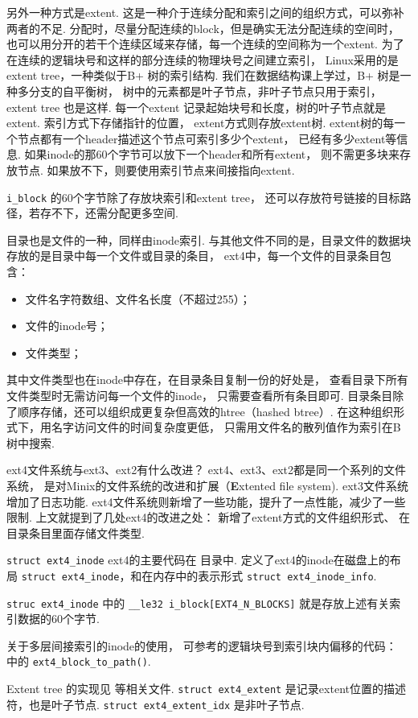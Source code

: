 另外一种方式是extent.
这是一种介于连续分配和索引之间的组织方式，可以弥补两者的不足.
分配时，尽量分配连续的block，但是确实无法分配连续的空间时，
也可以用分开的若干个连续区域来存储，每一个连续的空间称为一个extent. 
为了在连续的逻辑块号和这样的部分连续的物理块号之间建立索引，
Linux采用的是extent tree，一种类似于B+ 树的索引结构.
我们在数据结构课上学过，B+ 树是一种多分支的自平衡树，
树中的元素都是叶子节点，非叶子节点只用于索引，
extent tree 也是这样.
每一个extent 记录起始块号和长度，树的叶子节点就是extent.
索引方式下存储指针的位置，
extent方式则存放extent树.
extent树的每一个节点都有一个header描述这个节点可索引多少个extent，
已经有多少extent等信息.
如果inode的那60个字节可以放下一个header和所有extent，
则不需更多块来存放节点.
如果放不下，则要使用索引节点来间接指向extent.\cite{Ext4Extent}

\lstinline{i_block} 的60个字节除了存放块索引和extent tree，
还可以存放符号链接的目标路径，若存不下，还需分配更多空间.

目录也是文件的一种，同样由inode索引.
与其他文件不同的是，目录文件的数据块存放的是目录中每一个文件或目录的条目，
ext4中，每一个文件的目录条目包含：
\begin{itemize}
	\item 文件名字符数组、文件名长度（不超过255）；
	\item 文件的inode号；
	\item 文件类型；
\end{itemize}
其中文件类型也在inode中存在，在目录条目复制一份的好处是，
查看目录下所有文件类型时无需访问每一个文件的inode，
只需要查看所有条目即可.\cite{ext4dynamic}
目录条目除了顺序存储，还可以组织成更复杂但高效的htree（hashed btree）. 
在这种组织形式下，用名字访问文件的时间复杂度更低，
只需用文件名的散列值作为索引在B树中搜索.

\begin{qbox}{ext4文件系统与ext3、ext2有什么改进？}
	ext4、ext3、ext2都是同一个系列的文件系统，
	是对Minix的文件系统的改进和扩展（\textbf{E}xtented file system).
	ext3文件系统增加了日志功能.
	ext4文件系统则新增了一些功能，提升了一点性能，减少了一些限制.
	上文就提到了几处ext4的改进之处：
	新增了extent方式的文件组织形式、
	在目录条目里面存储文件类型.
\end{qbox}

\begin{readsrcbox}{\lstinline{struct ext4_inode}}
	ext4的主要代码在  目录中.
	 定义了ext4的inode在磁盘上的布局 \lstinline{struct ext4_inode}，和在内存中的表示形式 \lstinline{struct ext4_inode_info}.

	\lstinline{struc ext4_inode} 中的
	\lstinline{__le32 i_block[EXT4_N_BLOCKS]}
	就是存放上述有关索引数据的60个字节.

	关于多层间接索引的inode的使用，
	可参考的逻辑块号到索引块内偏移的代码：
	 中的 \lstinline{ext4_block_to_path()}.

	Extent tree 的实现见  等相关文件.
	\lstinline{struct ext4_extent} 是记录extent位置的描述符，也是叶子节点.
	\lstinline{struct ext4_extent_idx} 是非叶子节点.
\end{readsrcbox}


